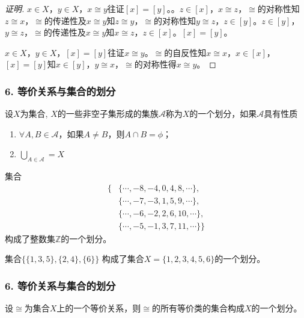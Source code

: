 \documentclass{beamer}
\begin{document}
\begin{CJK*}{UTF8}{gbsn}
\begin{frame}
\begin{proof}[证明]
    $x\in X$，\pause$y\in X$，$x\cong y$往证$[x]=[y]$。。$z\in [x]$，$x\cong z$，$\cong$的对称性知$z\cong x$，$\cong$的传递性及$x\cong y$知$z\cong y$，$\cong$的对称性知$y\cong z$，$z\in [y]$。$z\in [y]$，$y\cong z$，$\cong$的传递性及$x\cong y$知$x\cong z$，$z\in [x]$。$[x]=[y]$。

      $x\in X$，\pause$y\in X$，$[x]=[y]$往证$x\cong y$。$\cong$的自反性知$x\cong x$，$x\in [x]$，$[x]=[y]$知$x\in [y]$，$y\cong x$，$\cong$的对称性得$x\cong y$。
    \end{proof}

\end{frame}
\begin{frame}
  \frametitle{6. 等价关系与集合的划分}
  \begin{Def}
    设$X$为集合, $X$的一些非空子集形成的集族$\mathscr{A}$称为$X$的一个划分，如果$\mathscr{A}$具有性质
    \begin{enumerate}
    \item $\forall A, B \in \mathscr{A}$，如果$A \neq B$，则$A \cap B = \phi$；
      \item $\bigcup_{A \in \mathscr{A}} = X$
    \end{enumerate}
  \end{Def}
{\small\pause
  \begin{Ex}
    集合
    \begin{equation*}
      \begin{split}
      \{&\{\cdots,-8,-4,0,4,8,\cdots\},\\
      &\{\cdots,-7,-3,1,5,9,\cdots\},\\
      &\{\cdots,-6,-2,2,6,10,\cdots\},\\
      &\{\cdots,-5,-1,3,7,11,\cdots\}\}
    \end{split}
  \end{equation*}
构成了整数集$\mathbb{Z}$的一个划分。
\end{Ex}
\pause
  \begin{Ex}
    集合$\{\{1,3,5\},\{2,4\},\{6\}\}$
构成了集合$X=\{1,2,3,4,5,6\}$的一个划分。
  \end{Ex}
}
\end{frame}
\begin{frame}
  \frametitle{6. 等价关系与集合的划分}
  \small
  \begin{Thm6.2}
    设$\cong$为集合$X$上的一个等价关系，则$\cong$的所有等价类的集合构成$X$的一个划分。

\end{Thm6.2}
\end{frame}
\end{CJK*}
\end{document}
